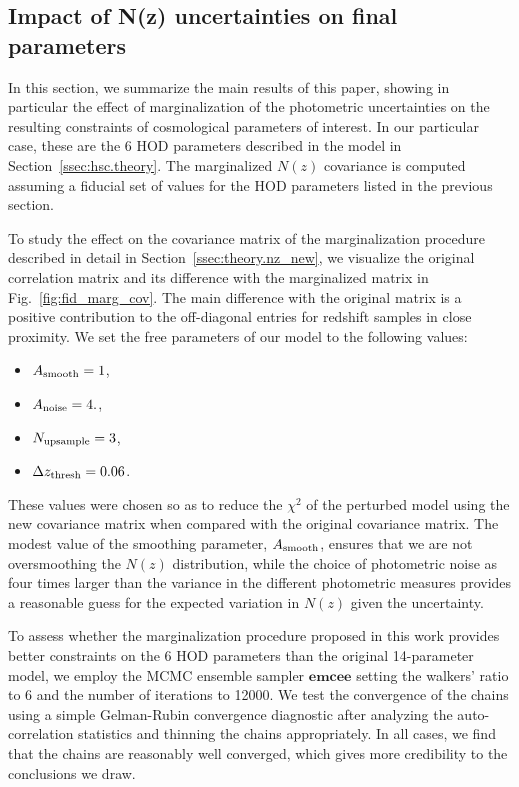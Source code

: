 \documentclass[a4paper,11pt]{article}
\begin{document}
\subsection{Impact of N(z) uncertainties on final parameters}
In this section, we summarize the main results of this
paper, showing in particular the effect of marginalization
of the photometric uncertainties on the resulting constraints
of cosmological parameters of interest. In our particular
case, these are the 6 HOD parameters described in the model
in Section~\ref{ssec:hsc.theory}. The marginalized $N(z)$ 
covariance is computed
assuming a fiducial set of values for the HOD parameters
listed in the previous section.

To study the effect on the covariance matrix
of the marginalization procedure described in detail
in Section~\ref{ssec:theory.nz_new}, we visualize the original
correlation matrix and its difference with the
marginalized matrix in Fig.~\ref{fig:fid_marg_cov}. The
main difference with the original matrix is
a positive contribution to the off-diagonal entries
for redshift samples in close proximity. We set the free
parameters of our model to the following values: 
\begin{itemize}
    \item $A_{\rm smooth} = 1$, 
    \item $A_{\rm noise} = 4.$,
    \item $N_{\rm upsample} = 3$, 
    \item $\Delta z_{\rm thresh} = 0.06$.
\end{itemize}
These values were chosen so as to reduce the
$\chi^2$ of the perturbed model 
using the new covariance matrix when compared with the
original covariance matrix. The modest value of the
smoothing parameter, $A_{\rm smooth}$, ensures that we 
are not oversmoothing the $N(z)$ distribution, while
the choice of photometric noise as four times 
larger than the variance in the different photometric
measures provides a reasonable guess for the expected
variation in $N(z)$ given the uncertainty.

To assess whether the marginalization procedure 
proposed in this work provides better constraints
on the 6 HOD parameters than the original 14-parameter
model, we employ the MCMC ensemble sampler
$\textbf{emcee}$ \cite{2013PASP..125..306F}
setting the
 walkers' ratio to 6 and
 the number of iterations to 12000. We test
the convergence of the chains using a simple Gelman-Rubin convergence diagnostic
after analyzing the auto-correlation statistics and thinning the
chains appropriately. In all cases, we find that the
chains are reasonably well converged,
which gives more credibility to the 
conclusions we draw.
\end{document}
